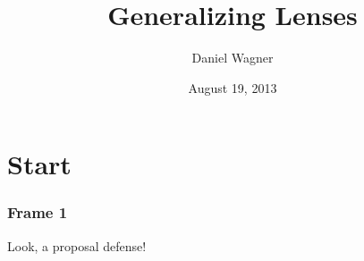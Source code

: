 \documentclass[14pt]{beamer}
\begin{document}
\title{Generalizing Lenses}
\author{Daniel Wagner}
\date[University of Pennsylvania]{August 19, 2013}
\maketitle

\section{Start}
\begin{frame}
    \frametitle{Frame 1}
    Look, a proposal defense!
\end{frame}
\end{document}
